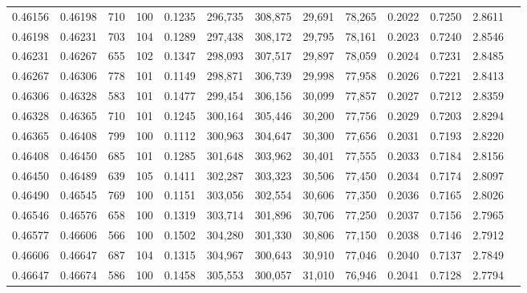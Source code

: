 \begin{tabular}{rrrrrrrrrrrrr}
0.46156 & 0.46198 &   710 & 100 &                                     0.1235 & 296,735 & 308,875 &  29,691 &  78,265 & 0.2022 & 0.7250 & 2.8611 \\
0.46198 & 0.46231 &   703 & 104 &                                     0.1289 & 297,438 & 308,172 &  29,795 &  78,161 & 0.2023 & 0.7240 & 2.8546 \\
0.46231 & 0.46267 &   655 & 102 &                                     0.1347 & 298,093 & 307,517 &  29,897 &  78,059 & 0.2024 & 0.7231 & 2.8485 \\
0.46267 & 0.46306 &   778 & 101 &                                     0.1149 & 298,871 & 306,739 &  29,998 &  77,958 & 0.2026 & 0.7221 & 2.8413 \\
0.46306 & 0.46328 &   583 & 101 &                                     0.1477 & 299,454 & 306,156 &  30,099 &  77,857 & 0.2027 & 0.7212 & 2.8359 \\
0.46328 & 0.46365 &   710 & 101 &                                     0.1245 & 300,164 & 305,446 &  30,200 &  77,756 & 0.2029 & 0.7203 & 2.8294 \\
0.46365 & 0.46408 &   799 & 100 &                                     0.1112 & 300,963 & 304,647 &  30,300 &  77,656 & 0.2031 & 0.7193 & 2.8220 \\
0.46408 & 0.46450 &   685 & 101 &                                     0.1285 & 301,648 & 303,962 &  30,401 &  77,555 & 0.2033 & 0.7184 & 2.8156 \\
0.46450 & 0.46489 &   639 & 105 &                                     0.1411 & 302,287 & 303,323 &  30,506 &  77,450 & 0.2034 & 0.7174 & 2.8097 \\
0.46490 & 0.46545 &   769 & 100 &                                     0.1151 & 303,056 & 302,554 &  30,606 &  77,350 & 0.2036 & 0.7165 & 2.8026 \\
0.46546 & 0.46576 &   658 & 100 &                                     0.1319 & 303,714 & 301,896 &  30,706 &  77,250 & 0.2037 & 0.7156 & 2.7965 \\
0.46577 & 0.46606 &   566 & 100 &                                     0.1502 & 304,280 & 301,330 &  30,806 &  77,150 & 0.2038 & 0.7146 & 2.7912 \\
0.46606 & 0.46647 &   687 & 104 &                                     0.1315 & 304,967 & 300,643 &  30,910 &  77,046 & 0.2040 & 0.7137 & 2.7849 \\
0.46647 & 0.46674 &   586 & 100 &                                     0.1458 & 305,553 & 300,057 &  31,010 &  76,946 & 0.2041 & 0.7128 & 2.7794 \\

\end{tabular}
